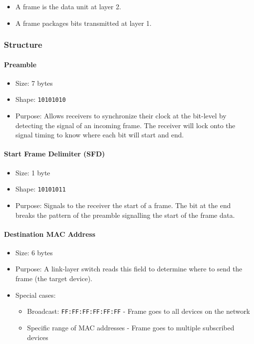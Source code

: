 \documentclass{article}
\begin{document}
\begin{itemize}
    \item A frame is the data unit at layer 2.
    \item A frame packages bits transmitted at layer 1.
\end{itemize}

\subsubsection{Structure}

\paragraph{Preamble}

\begin{itemize}
    \item Size: 7 bytes
    \item Shape: \texttt{10101010}
    \item Purpose: Allows receivers to synchronize their clock at the bit-level by detecting the signal of an incoming frame. The receiver will lock onto the signal timing to know where each bit will start and end.
\end{itemize}

\paragraph{Start Frame Delimiter (SFD)}

\begin{itemize}
    \item Size: 1 byte
    \item Shape: \texttt{10101011}
    \item Purpose: Signals to the receiver the start of a frame. The bit at the end breaks the pattern of the preamble signalling the start of the frame data.
\end{itemize}

\paragraph{Destination MAC Address}

\begin{itemize}
    \item Size: 6 bytes
    \item Purpose: A link-layer switch reads this field to determine where to send the frame (the target device).
    \item Special cases:
    \begin{itemize}
        \item Broadcast: \texttt{FF:FF:FF:FF:FF:FF} - Frame goes to all devices on the network
        \item Specific range of MAC addresses - Frame goes to multiple subscribed devices
    \end{itemize}
\end{itemize}
\end{document}
